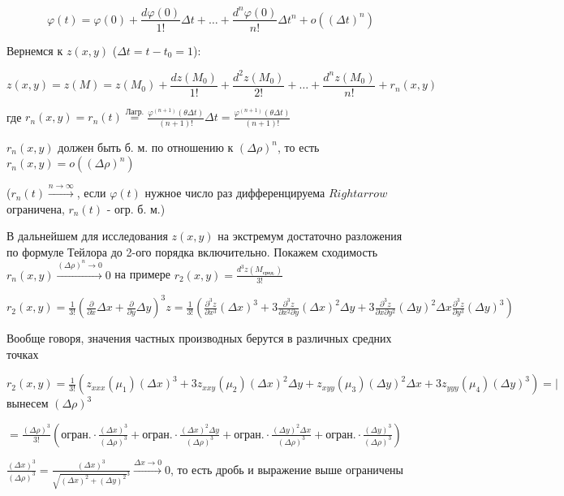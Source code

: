 \documentclass[12pt]{article}
\begin{document}
    \[\varphi(t) = \varphi(0) + \frac{d\varphi(0)}{1!} \Delta t + \dots + \frac{d^{n}\varphi(0)}{n!} \Delta t^n + o((\Delta t)^n)\]

    Вернемся к $z(x, y)$ ($\Delta t = t - t_0 = 1$):

    \[z(x, y) = z(M) = z(M_0) + \frac{dz(M_0)}{1!} + \frac{d^2 z(M_0)}{2!} + \dots + \frac{d^n z(M_0)}{n!} + r_n(x, y)\]

    где $r_n(x, y) = r_n(t) \stackrel{\text{Лагр.}}{=} \frac{\varphi^{(n+1)}(\theta \Delta t)}{(n + 1)!} \Delta t = \frac{\varphi^{(n+1)}(\theta \Delta t)}{(n + 1)!}$

    $r_n(x, y)$ должен быть б. м. по отношению к $(\Delta \rho)^n$, то есть $r_n(x, y) = o((\Delta \rho)^n)$

    ($r_n(t) \stackrel{n \to \infty}{\rightarrow}$, если $\varphi(t)$ нужное число раз дифференцируема $Rightarrow$ ограничена, $r_n(t)$ - огр. б. м.)

    \Nota В дальнейшем для исследования $z(x, y)$ на экстремум достаточно разложения по формуле Тейлора до 2-ого порядка включительно.
    Покажем сходимость $r_n(x, y) \stackrel{(\Delta \rho)^n \to 0}{\rightarrow} 0$ на примере $\displaystyle r_2 (x, y) = \frac{d^3 z(M_{\text{сред.}})}{3!}$


    $r_2(x, y) = \frac{1}{3!} (\frac{\partial}{\partial x} \Delta x + \frac{\partial}{\partial y} \Delta y)^3 z =
    \frac{1}{3!} (\frac{\partial^3 z}{\partial x^3} (\Delta x)^3 + 3 \frac{\partial^3 z}{\partial x^2 \partial y} (\Delta x)^2 \Delta y +
    3 \frac{\partial^3 z}{\partial x \partial y^2} (\Delta y)^2 \Delta x \frac{\partial^3 z}{\partial y^3} (\Delta y)^3)$

    Вообще говоря, значения частных производных берутся в различных средних точках

    $r_2(x, y) = \frac{1}{3!} (z_{xxx}(\mu_1)(\Delta x)^3 + 3 z_{xxy}(\mu_2)(\Delta x)^2 \Delta y + z_{xyy}(\mu_3)(\Delta y)^2 \Delta x + 3 z_{yyy}(\mu_4)(\Delta y)^3) = \Big|$ вынесем $(\Delta \rho)^3$

    $= \frac{(\Delta \rho)^3}{3!} (\text{огран.} \cdot \frac{(\Delta x)^3}{(\Delta \rho)^3} + \text{огран.} \cdot \frac{(\Delta x)^2 \Delta y}{(\Delta \rho)^3} + \text{огран.} \cdot \frac{(\Delta y)^2 \Delta x}{(\Delta \rho)^3} + \text{огран.} \cdot \frac{(\Delta y)^3}{(\Delta \rho)^3})$

    $\frac{(\Delta x)^3}{(\Delta \rho)^3} = \frac{(\Delta x)^3}{\sqrt{(\Delta x)^2 + (\Delta y)^2}^3} \stackrel{\Delta x \to 0}{\rightarrow} 0$, то есть дробь и выражение выше ограничены
\end{document}
